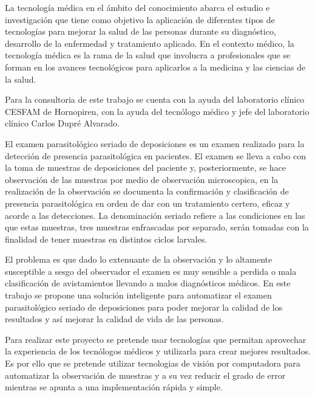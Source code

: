 \documentclass[letter,12pt]{report}
\begin{document}
    La tecnología médica en el ámbito del conocimiento abarca el estudio e investigación
    que tiene como objetivo la aplicación de diferentes tipos de tecnologías para mejorar
    la salud de las personas durante su diagnóstico, desarrollo de la enfermedad y
    tratamiento aplicado. En el contexto médico, la tecnología médica es la rama de la
    salud que involucra a profesionales que se forman en los avances tecnológicos para
    aplicarlos a la medicina y las ciencias de la salud. %

    Para la consultoria de este trabajo se cuenta con la ayuda del laboratorio clínico
    CESFAM de Hornopiren, con la ayuda del tecnólogo médico y jefe del laboratorio
    clínico Carlos Dupré Alvarado.

    El examen parasitológico seriado de deposiciones es un examen realizado para la
    detección de presencia parasitológica en pacientes. El examen se lleva a cabo con la
    toma de muestras de deposiciones del paciente y, posteriormente, se hace observación
    de las muestras por medio de observación microscopica, en la realización de la
    observación se documenta la confirmación y clasificación de presencia parasitológica
    en orden de dar con un tratamiento certero, eficaz y acorde a las detecciones. %
    La denominación seriado refiere a las condiciones en las que estas muestras, tres
    muestras enfrascadas por separado, serán tomadas con la finalidad de tener muestras
    en distintos ciclos larvales.

    El problema es que dado lo extenuante de la observación y lo altamente susceptible a
    sesgo del observador el examen es muy sensible a perdida o mala clasificación de
    avistamientos llevando a malos diagnósticos médicos. En este trabajo se propone una
    solución inteligente para automatizar el examen parasitológico seriado de
    deposiciones para poder mejorar la calidad de los resultados y así mejorar la calidad
    de vida de las personas.

    Para realizar este proyecto se pretende usar tecnologías que permitan aprovechar la
    experiencia de los tecnólogos médicos y utilizarla para crear mejores resultados.
    Es por ello que se pretende utilizar tecnologias de visión por computadora para
    automatizar la observación de muestras y a su vez reducir el grado de error mientras
    se apunta a una implementación rápida y simple.
\end{document}

